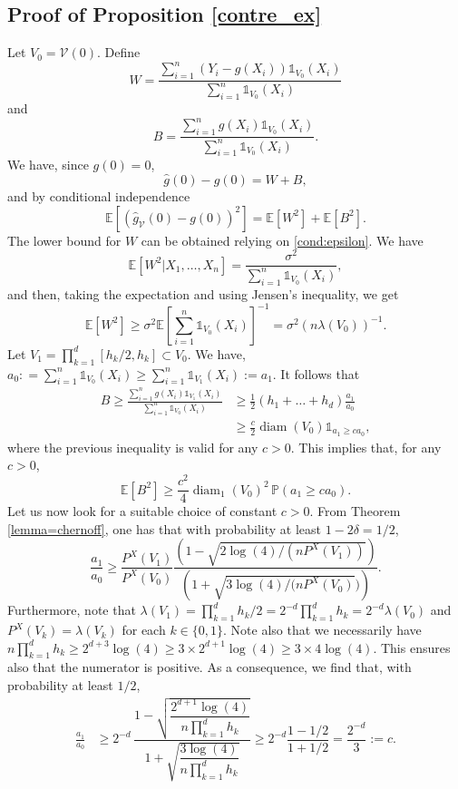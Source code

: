\documentclass[paper=a4, fontsize=11pt]{scrartcl}
\newcommand{\diam}{\operatorname{diam}}
\newcommand{\ind}{\mathds{1}}
\newcommand{\PP}{\mathbb{P}}
\newcommand{\EE}{\mathbb{E}}
\begin{document}
\subsection*{Proof of Proposition \ref{contre_ex}}

Let $V_0 =  \mathcal V(0) $. Define
$$ W =  \frac{\sum_{i=1} ^n  (Y_i - g(X_i) ) \ind_{ V_0} (X_i)}{\sum_{i=1} ^n    \ind_{V_0 } (X_i)}  $$
and 
 $$B = \frac{\sum_{i=1} ^n  g(X_i)   \ind_{V_0 } (X_i)}{\sum_{i=1} ^n    \ind_{V_0} (X_i)}. $$
We have, since $g(0) = 0$, 
$$\hat g(0) - g(0) =  W + B , $$
and by conditional independence
$$ \EE [ (\hat g_{\mathcal V} (0 ) -  g(0 ))^2 ]  = \EE[W^2] + \EE [B^2]. $$
The lower bound for $W$ can be obtained relying on \ref{cond:epsilon}. We have
$$ \EE [W^2 |X_1,\ldots, X_n] = \frac{\sigma^2}{\sum_{i=1} ^ n \ind_{ V_0 } (X_i) } , $$
and then, taking the expectation and using Jensen's inequality, we get
$$  \EE [W^2 ] \geq \sigma^2  \EE \left[ \sum_{i=1} ^ n \ind_{V_0 } (X_i) \right]^{-1} = \sigma^2 ( n \lambda (V_0) ) ^{-1}.$$
 Let  $V_1 = \prod_{k=1}^d [h_k/2 , h_k] \subset V_0$. We have, $a_0: = \sum_{i=1} ^n \ind_{V_0} (X_i)\geq \sum_{i=1} ^n \ind_{{ V_1}} (X_i) := a_1$. It follows that
\begin{align*}
   B \geq \frac{\sum_{i=1} ^n g(X_i) \ind_{V_1} (X_i)}{\sum_{i=1} ^n \ind_{V_0} (X_i)}
    &\geq \frac{1}{2} ( h_1+ \dots + h_d ) \frac{a_1}{a_0} \\ &\geq \frac{c}{2}  \diam( V_0) \ind_{a_1\geq c a_0 } ,
\end{align*}
where the previous inequality is valid for any $c>0$. This implies that, for any $c>0$,
$$ \EE[B^2 ] \geq \frac{c^2}{4}  \diam _1 ( V_0) ^2 \,  \PP(  {a_1\geq ca_0 } ).$$
Let us now look for a suitable choice of constant \( c > 0\). From Theorem \ref{lemma=chernoff}, one has that with probability at least $1 - 2\delta = 1/2$,
$$ \frac{a_1}{a_0} \geq \frac{P^X({ V_1})}{P^X( V_0)} \frac{\left( 1 - \sqrt {2\log(4 ) / (n P^X( V_1)) }  \right )}{\left( 1 + \sqrt {3\log(4 ) / (n  P^X({  V_0 })})  \right )}.$$ Furthermore, note that $\lambda({ V_1}) = \prod_{k=1}^d h_k/2 = 2^{-d} \prod_{k=1}^d h_k = 2^{-d} \lambda( V_0)$ and $P^X({  V_k}) = \lambda({  V_k})$ for each  $k \in \{0,1\}$. Note also that we necessarily have $n \prod_{k=1}^d h_k \geq  2^{d+3} \log(4) \geq 3 \times 2^{d+1} \log(4) \geq 3 \times 4 \log(4).$ This ensures also that the numerator is positive. As a consequence, we find that, with probability at least $1/2$,
\begin{align*}
    \frac{a_1}{a_0} &\geq 2^{-d} \, \dfrac{1 - \sqrt{\dfrac{2^{d+1} \log(4)}{n \prod_{k=1}^d h_k}}}{1+ \sqrt{\dfrac{3 \log(4)}{n \prod_{k=1}^d h_k}}} \geq 2^{-d} \dfrac{1 - 1/2}{1 + 1/2} = \dfrac{2^{-d}}{3} := c.
\end{align*}
\end{document}
